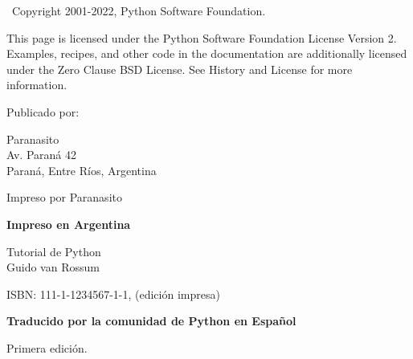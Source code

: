 \newpage

\bigskip

\textcopyright\ Copyright 2001-2022, Python Software Foundation.

\bigskip

This page is licensed under the Python Software Foundation License Version 2.
Examples, recipes, and other code in the documentation are additionally licensed under the Zero Clause BSD License.
See History and License for more information.

\begin{adjustwidth}{1cm}{1cm}

\bigskip
Publicado por:
  \begin{adjustwidth}{1cm}{1cm}
		Paranasito\\
		Av. Paraná 42\\
		Paraná, Entre Ríos, Argentina
  \end{adjustwidth}

Impreso por Paranasito\par
\bigskip
\textbf{Impreso en Argentina}


Tutorial de Python \\ \hspace*{10mm}Guido van Rossum

ISBN: 111-1-1234567-1-1, (edición impresa)

\textbf{Traducido por la comunidad de Python en Español}

\bigskip

	Primera edición.

\end{adjustwidth}
